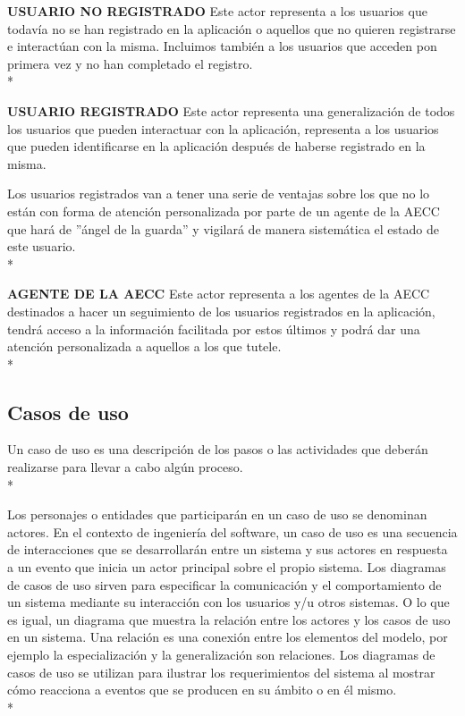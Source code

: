 \documentclass[../pfc.tex]{subfiles}
\begin{document}
	\textbf{USUARIO NO REGISTRADO}
	Este actor representa a los usuarios que todavía no se han registrado en la aplicación o aquellos que no quieren registrarse e interactúan con la misma. Incluimos también a los usuarios que acceden pon primera vez y no han completado el registro.\\*
	
	\textbf{USUARIO REGISTRADO}
	Este actor representa una generalización de todos los usuarios que pueden interactuar con la aplicación, representa a los usuarios que pueden identificarse en la aplicación después de haberse registrado en la misma.
	
	Los usuarios registrados van a tener una serie de ventajas sobre los que no lo están con forma de atención personalizada por parte de un agente de la AECC que hará de ''ángel de la guarda'' y vigilará de manera sistemática el estado de este usuario.\\*
	
	\textbf{AGENTE DE LA AECC}
	Este actor representa a los agentes de la AECC destinados a hacer un seguimiento de los usuarios registrados en la aplicación, tendrá acceso a la información facilitada por estos últimos y podrá dar una atención personalizada a aquellos a los que tutele.\\*
		
	\subsection{Casos de uso }
		
	Un caso de uso es una descripción de los pasos o las actividades que deberán realizarse para llevar a cabo algún proceso.\\*
	
	Los personajes o entidades que participarán en un caso de uso se denominan actores. En el contexto de ingeniería del software, un caso de uso es una secuencia de interacciones que se desarrollarán entre un sistema y sus actores en respuesta a un evento que inicia un actor principal sobre el propio sistema. Los diagramas de casos de uso sirven para especificar la comunicación y el comportamiento de un sistema mediante su interacción con los usuarios y/u otros sistemas. O lo que es igual, un diagrama que muestra la relación entre los actores y los casos de uso en un sistema. Una relación es una conexión entre los elementos del modelo, por ejemplo la especialización y la generalización son relaciones. Los diagramas de casos de uso se utilizan para ilustrar los requerimientos del sistema al mostrar cómo reacciona a eventos que se producen en su ámbito o en él mismo.\\*
	
\end{document}
